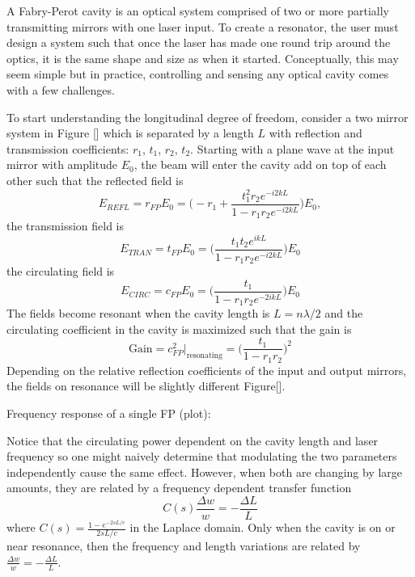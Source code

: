 		A Fabry-Perot cavity is an optical system comprised of two or more partially transmitting mirrors with one laser input.  To create a resonator, the user must design a system such that once the laser has made one round trip around the optics, it is the same shape and size as when it started.  Conceptually, this may seem simple but in practice, controlling and sensing any optical cavity comes with a few challenges.
		
		To start understanding the longitudinal degree of freedom, consider a two mirror system in Figure [] which is separated by a length $L$ with reflection and transmission coefficients: $r_1$, $t_1$, $r_2$, $t_2$.	
		Starting with a plane wave at the input mirror with amplitude $E_0$, the beam will enter the cavity add on top of each other such that the reflected field \cite{Saulson} is 
		\begin{equation}\label{r_FP}
		E_{REFL} = r_{FP} E_0 = \bigg(-r_1 + \frac{t_1^2 r_2  e^{-i2kL}}{1-r_1 r_2 e^{-i2kL}} \bigg) E_0,
		\end{equation}
		the transmission field is
		\begin{equation}\label{t_FP}
		E_{TRAN} = t_{FP} E_{0} = \bigg( \frac{t_1 t_2 e^{ikL}}{1-r_1 r_2 e^{-i2kL}}\bigg) E_0
		\end{equation}
		the circulating field is
		\begin{equation}\label{c_FP}
		E_{CIRC} = c_{FP} E_0 = \bigg(\frac{t_1}{1- r_1 r_2 e^{-2ikL}} \bigg) E_0
		\end{equation}
		The fields become resonant when the cavity length is $L = n \lambda / 2$ and the circulating coefficient in the cavity is maximized such that the gain is
		\begin{equation}
		\text{Gain} = c^2_{FP} \vert_{\text{resonating}} = \bigg( \frac{t_1}{1-r_1 r_2}\bigg)^2
		\end{equation}
		Depending on the relative reflection coefficients of the input and output mirrors, the fields on resonance will be slightly different Figure[].
		
		Frequency response of a single FP (plot):
		
		Notice that the circulating power dependent on the cavity length and laser frequency so one might naively determine that modulating the two parameters independently cause the same effect.  However, when both are changing by large amounts, they are related by a frequency dependent transfer function
		\begin{equation}
		C(s) \frac{\Delta w}{w} = -\frac{\Delta L}{L}
		\end{equation}
		where $C(s) = \frac{1-e^{-2sL/c}}{2sL/c}$ in the Laplace domain.  Only when the cavity is on or near resonance, then the frequency and length variations are related by $\frac{\Delta w}{w} = -\frac{\Delta L}{L}$.
		

